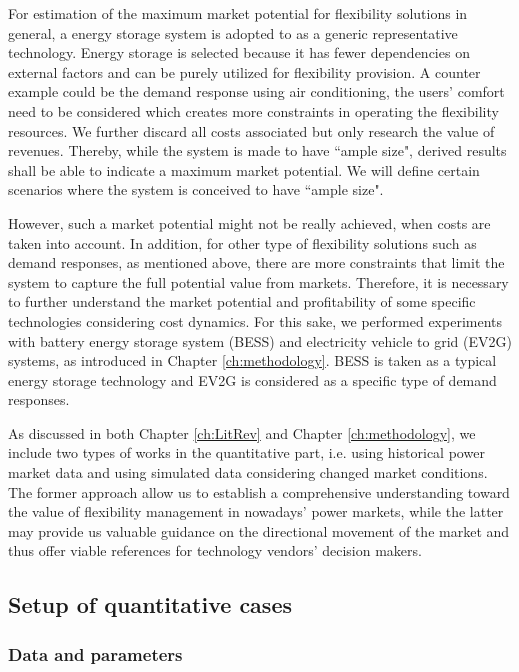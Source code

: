 For estimation of the maximum market potential for flexibility solutions in general, a energy storage system is adopted to as a generic representative technology. Energy storage is selected because it has fewer dependencies on external factors and can be purely utilized for flexibility provision. 
A counter example could be the demand response using air conditioning, the users' comfort need to be considered which creates more constraints in operating the flexibility resources. We further discard all costs associated but only research the value of revenues. Thereby, while the system is made to have ``ample size", derived results shall be able to indicate a maximum market potential. We will define certain scenarios where the system is conceived to have ``ample size".

However, such a market potential might not be really achieved, when costs are taken into account. In addition, for other type of flexibility solutions such as demand responses, as mentioned above, there are more constraints that limit the system to capture the full potential value from markets. Therefore, it is necessary to further understand the market potential and profitability of some specific technologies considering cost dynamics. For this sake, we performed experiments with battery energy storage system (BESS) and electricity vehicle to grid (EV2G) systems, as introduced in  Chapter \ref{ch:methodology}. BESS is taken as a typical energy storage technology and EV2G is considered as a specific type of demand responses. 

As discussed in both Chapter \ref{ch:LitRev} and Chapter \ref{ch:methodology}, we include two types of works in the quantitative part, i.e. using historical power market data and using simulated data considering changed market conditions. The former approach allow us to establish a comprehensive understanding toward the value of flexibility management in nowadays' power markets, while the latter may provide us valuable guidance on the directional movement of the market and thus offer viable references for technology vendors' decision makers.

\subsection{Setup of quantitative cases}
\subsubsection{Data and parameters}
\label{sec:data-parameter}

